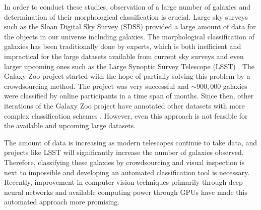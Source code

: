 \documentclass[a4paper,fleqn,usenatbib]{mnras}
\begin{document}
 In order to conduct these studies, observation of a large number of galaxies and determination of their morphological classification is crucial. Large sky surveys such as the Sloan Digital Sky Survey (SDSS) \citep[e.g.,][]{blanton2017sloan} provided a large amount of data for the objects in our universe including galaxies. The morphological classification of galaxies has been traditionally done by experts, which is both inefficient and impractical for the large datasets available from current sky surveys and even larger upcoming ones such as the Large Synoptic Survey Telescope (LSST) \citep{ivezic2008lsst}. The Galaxy Zoo project \citep{lintott2008galaxy} started with the hope of partially solving this problem by a crowdsourcing method. The project was very successful and $\sim 900, 000$ galaxies were classified by online participants in a time span of months. Since then, other iterations of the Galaxy Zoo project  have annotated other datasets with more complex classification schemes \citep[e.g.,][]{willett2016galaxy}. However, even this approach is not feasible for the available and upcoming large datasets. 
 
 The amount of data is increasing as modern telescopes continue to take data, and projects like LSST will significantly increase the number of galaxies observed. Therefore, classifying these galaxies by crowdsourcing and visual inspection is next to impossible and developing an automated classification tool is necessary. Recently, improvement in computer vision techniques primarily through deep neural networks \citep[e.g.,][]{krizhevsky2012imagenet} and available computing power through GPUs have made this automated approach more promising. 
 
\end{document}
